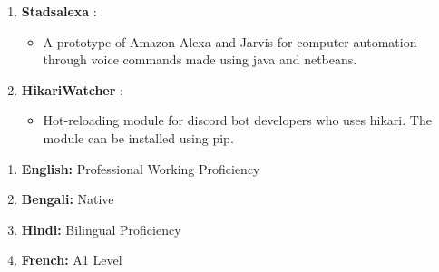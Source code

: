 \documentclass[a4paper, oneside, 12pt]{article}
\makeatletter
\def\vhrulefill#1{\leavevmode\leaders\hrule\@height#1\hfill \kern\z@}
\makeatother
\begin{document}
\begin{enumerate}[label =, itemsep = 2mm, topsep = 0pt, partopsep = 0pt]

        \pagebreak

  \item
        \textbf{Stadsalexa }:
        \begin{itemize}[label = - , topsep = 0pt, partopsep = 0pt]
          \item A prototype of Amazon Alexa and Jarvis for computer automation through voice commands made using java and netbeans.
        \end{itemize}

  \item
        \textbf{HikariWatcher }:
        \begin{itemize}[label = - , topsep = 0pt, partopsep = 0pt]
          \item Hot-reloading module for discord bot developers who uses hikari. The module can be installed using pip.
        \end{itemize}

\end{enumerate}





\vspace{2mm}

\color[HTML]{0F00FF}{\normalsize Communication}  \color{gray}{\vhrulefill{1.5pt}}

\footnotesize
\begin{enumerate}[label = , topsep = 2mm, partopsep = 0pt, itemsep = -1pt]
  \color{black}
  \item \textbf{English:} Professional Working Proficiency

  \item \textbf{Bengali:} Native

  \item \textbf{Hindi:} Bilingual Proficiency

  \item \textbf{French:} A1 Level
\end{enumerate}
\end{document}
